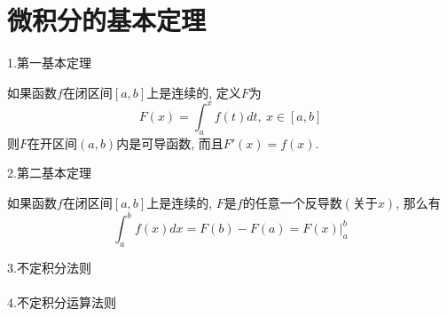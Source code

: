 \chapter{微积分的基本定理}
1.第一基本定理\\[-4ex]
\begin{theorem}[微积分的第一基本定理:]
如果函数$f$在闭区间$[a,b]$上是连续的, 定义$F$为
\[F(x)=\int_a^xf(t)dt,\ x\in[a,b]\]
则$F$在开区间$(a,b)$内是可导函数, 而且$F'(x)=f(x)$.
\end{theorem}\vspace{4ex}

2.第二基本定理\\[-4ex]
\begin{theorem}[微积分的第二基本定理:]
如果函数$f$在闭区间$[a,b]$上是连续的, $F$是$f$的任意一个反导数$(\text{关于}x)$, 那么有
\[\int_a^bf(x)dx=F(b)-F(a)=F(x)\Big|_a^b\]
\end{theorem}\vspace{4ex}

3.不定积分法则\\[1ex]
\\[4ex]

4.不定积分运算法则\\[-4ex]
\begin{center}
\\[2ex]
\end{center}\vspace{4ex}

